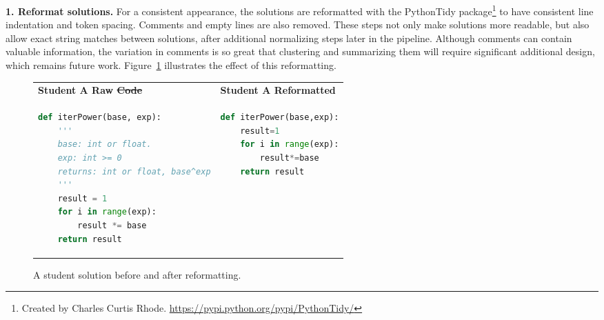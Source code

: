 \documentclass[12pt,twoside]{mitthesis}
\providecommand{\DIFaddtex}[1]{{\protect\color{blue}\uwave{#1}}} %
\providecommand{\DIFdeltex}[1]{{\protect\color{red}\sout{#1}}}                      %
\providecommand{\DIFaddFL}[1]{\DIFadd{#1}} %
\providecommand{\DIFdelFL}[1]{\DIFdel{#1}} %
\providecommand{\DIFaddbeginFL}{} %
\providecommand{\DIFaddendFL}{} %
\providecommand{\DIFdelbeginFL}{} %
\providecommand{\DIFdelendFL}{} %
\providecommand{\DIFadd}[1]{\texorpdfstring{\DIFaddtex{#1}}{#1}} %
\providecommand{\DIFdel}[1]{\texorpdfstring{\DIFdeltex{#1}}{}} %
\begin{document}
{\bf 1. Reformat solutions.} For a consistent appearance, the solutions are reformatted with the PythonTidy package\footnote{Created by Charles Curtis Rhode. \url{https://pypi.python.org/pypi/PythonTidy/}} to have consistent line indentation and token spacing. Comments and empty lines are also removed. These steps not only make solutions more readable, but also allow exact string matches between solutions, after additional normalizing steps later in the pipeline. Although comments can contain valuable information, the variation in comments is so great that clustering and summarizing them will require significant additional design, which remains future work. Figure~\ref{fig:reformat} illustrates the effect of this reformatting.
\begin{figure}
\begin{tabular}{ll}
{\bf Student A Raw \DIFdelbeginFL \DIFdelFL{Code}\DIFdelendFL \DIFaddbeginFL \DIFaddFL{Solution}\DIFaddendFL } & {\bf Student A Reformatted} \\
\begin{minipage}{0.5\linewidth}
\begin{lstlisting}[basicstyle=\linespread{1.0}\ttfamily\footnotesize,language=python]
def iterPower(base, exp):
    '''
    base: int or float.
    exp: int >= 0
    returns: int or float, base^exp
    '''
    result = 1
    for i in range(exp):
        result *= base
    return result
\end{lstlisting}
\end{minipage}
&
\begin{minipage}{0.5\linewidth}
\begin{lstlisting}[basicstyle=\linespread{1.0}\ttfamily\footnotesize,language=python]
def iterPower(base,exp):
    result=1
    for i in range(exp):
        result*=base
    return result
\end{lstlisting}
\end{minipage}
\end{tabular}
\caption{A student solution before and after reformatting.}
\label{fig:reformat}
\end{figure}
\end{document}
